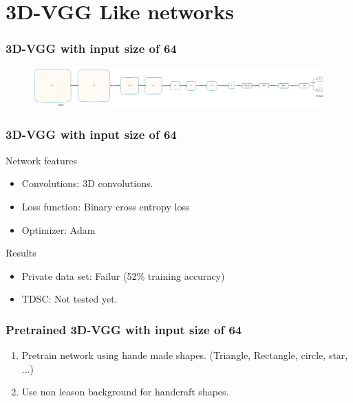 \documentclass{beamer}
\begin{document}
\section{3D-VGG Like networks}


\begin{frame}
	\frametitle{3D-VGG with input size of 64}
	\begin{center}
		\begin{figure}
			\includegraphics[scale=0.14]{3d-vgg.png}
			\centering
		\end{figure}
	\end{center}		
\end{frame}

\begin{frame}
	\frametitle{3D-VGG with input size of 64}
	\begin{block}{Network features}
		\begin{itemize}
			\item Convolutions: 3D convolutions.
			\item Loss function: Binary cross entropy loss
			\item Optimizer: Adam
		\end{itemize}
	\end{block}
	
	\begin{block}{Results}
		\begin{itemize}
			\item Private data set: Failur (52\% training accuracy)
			\item TDSC: Not tested yet.
		\end{itemize}
	\end{block}
\end{frame}

\begin{frame}
	\frametitle{Pretrained 3D-VGG with input size of 64}
	\begin{enumerate}
		\item Pretrain network using hande made shapes. (Triangle, Rectangle, circle, star, ...)
		\item Use non leason background for handcraft shapes.
	\end{enumerate}
\end{frame}
\end{document}
